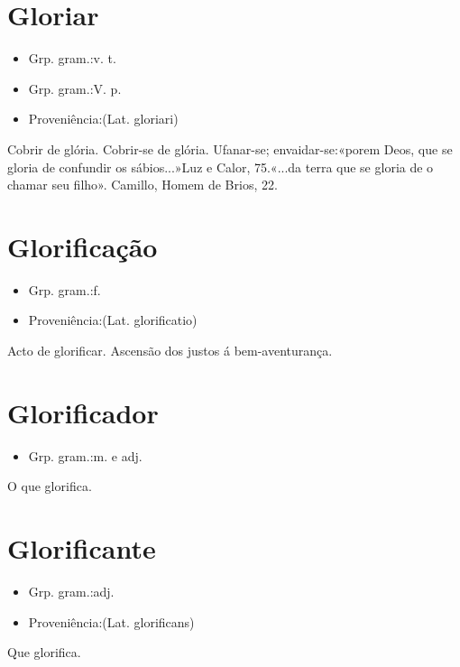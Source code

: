 \section{Gloriar}
\begin{itemize}
\item {Grp. gram.:v. t.}
\end{itemize}
\begin{itemize}
\item {Grp. gram.:V. p.}
\end{itemize}
\begin{itemize}
\item {Proveniência:(Lat. \textunderscore gloriari\textunderscore )}
\end{itemize}
Cobrir de glória.
Cobrir-se de glória.
Ufanar-se; envaidar-se:«\textunderscore porem Deos, que se gloria de confundir os sábios...\textunderscore »\textunderscore Luz e Calor\textunderscore , 75.«\textunderscore ...da terra que se gloria de o chamar seu filho\textunderscore ». Camillo, \textunderscore Homem de Brios\textunderscore , 22.
\section{Glorificação}
\begin{itemize}
\item {Grp. gram.:f.}
\end{itemize}
\begin{itemize}
\item {Proveniência:(Lat. \textunderscore glorificatio\textunderscore )}
\end{itemize}
Acto de glorificar.
Ascensão dos justos á bem-aventurança.
\section{Glorificador}
\begin{itemize}
\item {Grp. gram.:m.  e  adj.}
\end{itemize}
O que glorifica.
\section{Glorificante}
\begin{itemize}
\item {Grp. gram.:adj.}
\end{itemize}
\begin{itemize}
\item {Proveniência:(Lat. \textunderscore glorificans\textunderscore )}
\end{itemize}
Que glorifica.
